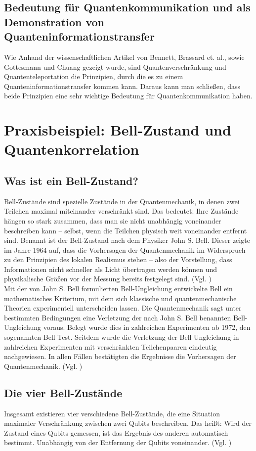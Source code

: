 \subsection{Bedeutung für Quantenkommunikation und als Demonstration von Quanteninformationstransfer}
Wie Anhand der wissenschaftlichen Artikel von Bennett, Brassard et. al., sowie Gottesmann und Chuang gezeigt wurde, sind Quantenverschränkung und Quantenteleportation die Prinzipien, durch die es zu einem Quanteninformationstransfer kommen kann. Daraus kann man schließen, dass beide Prinzipien eine sehr wichtige Bedeutung für Quantenkommunikation haben.

\section{Praxisbeispiel: Bell-Zustand und Quantenkorrelation}
\subsection{Was ist ein Bell-Zustand?}
Bell-Zustände sind spezielle Zustände in der Quantenmechanik, in denen zwei Teilchen maximal miteinander verschränkt sind. Das bedeutet: Ihre Zustände hängen so stark zusammen, dass man sie nicht unabhängig voneinander beschreiben kann – selbst, wenn die Teilchen physisch weit voneinander entfernt sind. Benannt ist der Bell-Zustand nach dem Physiker John S. Bell. Dieser zeigte im Jahre 1964 auf, dass die Vorhersagen der Quantenmechanik im Widerspruch zu den Prinzipien des lokalen Realismus stehen – also der Vorstellung, dass Informationen nicht schneller als Licht übertragen werden können und physikalische Größen vor der Messung bereits festgelegt sind. (Vgl. \cite[S.195]{bell_einstein_1964})
\\


Mit der von John S. Bell formulierten Bell-Ungleichung entwickelte Bell ein mathematisches Kriterium, mit dem sich klassische und quantenmechanische Theorien experimentell unterscheiden lassen. Die Quantenmechanik sagt unter bestimmten Bedingungen eine Verletzung der nach John S. Bell benannten Bell-Ungleichung voraus. Belegt wurde dies in zahlreichen Experimenten ab 1972, den sogenannten Bell-Test. Seitdem wurde die Verletzung der Bell-Ungleichung in zahlreichen Experimenten mit verschränkten Teilchenpaaren eindeutig nachgewiesen. In allen Fällen bestätigten die Ergebnisse die Vorhersagen der Quantenmechanik. 
(Vgl. \cite[S.53-59]{homeister_quantum_2022})

\subsection{Die vier Bell-Zustände}
Insgesamt existieren vier verschiedene Bell-Zustände, die eine Situation maximaler Verschränkung zwischen zwei Qubits beschreiben. Das heißt: Wird der Zustand eines Qubits gemessen, ist das Ergebnis des anderen automatisch bestimmt. Unabhängig von der Entfernung der Qubits voneinander. (Vgl. \cite[S.53-55]{homeister_quantum_2022}) 
\\


